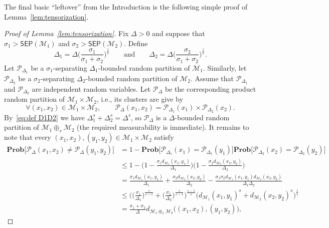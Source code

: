 \documentclass[11pt,reqno]{amsart}
\renewcommand{\le}{\leqslant}
\theoremstyle{remark}
\newcommand{\MM}{\mathcal{M}}
\renewcommand{\Pr}{\mathbf{Prob}}
\renewcommand{\1}{\mathbf 1}
\newcommand{\Part}{\mathscr{P}}
\newcommand{\sep}{\mathsf{SEP}}
\begin{document}
The final basic ``leftover'' from the Introduction is the following simple proof of Lemma~\ref{lem:tensorization}.

\begin{proof}[Proof of Lemma~\ref{lem:tensorization}] Fix $\Delta>0$ and suppose that  $\sigma_1>\sep(\MM_1)$ and $\sigma_2>\sep(\MM_2)$. Define
\begin{equation}\label{eq:def D1D2}
\Delta_1=\Delta\Big(\frac{\sigma_1}{\sigma_1+\sigma_2}\Big)^{\frac{1}{s}}\qquad\mathrm{and}\qquad  \Delta_2=\Delta\Big(\frac{\sigma_2}{\sigma_1+\sigma_2}\Big)^{\frac{1}{s}}.
\end{equation}
Let $\Part_{\Delta_1}$ be a $\sigma_1$-separating $\Delta_1$-bounded random partition of $\MM_1$. Similarly,  let $\Part_{\Delta_2}$ be a $\sigma_2$-separating $\Delta_2$-bounded random partition of $\MM_2$. Assume that $\Part_{\Delta_1}$ and $\Part_{\Delta_2}$ are independent random variables. Let $\Part_{\Delta}$ be the corresponding product random partition of $\MM_1\times\MM_2$, i.e., its clusters are give by
\begin{equation}\label{eq:product partition}
\forall(x_1,x_2)\in \MM_1\times \MM_2,\qquad \Part_\Delta(x_1,x_2)= \Part_{\Delta_1}(x_1)\times \Part_{\Delta_2}(x_2).
\end{equation}
By~\eqref{eq:def D1D2} we have $\Delta_1^s+\Delta_2^s=\Delta^s$, so $\Part_\Delta$ is a $\Delta$-bounded random partition of $\MM_1\oplus_s\MM_2$ (the required  measurability is immediate). It remains to note that every $(x_1,x_2),(y_1,y_2)\in \MM_1\times \MM_2$ satisfy
\begin{align}
\Pr\big[\Part_\Delta(x_1,x_2)\neq \Part_\Delta(y_1,y_2)\big]&=1-\Pr \big[\Part_{\Delta_1}(x_1)=\Part_{\Delta_1}(y_1)\big]\Pr \big[ \Part_{\Delta_2}(x_2)=\Part_{\Delta_2}(y_2)\big]\label{eq:use independence} \\
&\le1- \bigg(1-\frac{\sigma_1d_{\MM_1}(x_1,y_1)}{\Delta_1}\bigg)\bigg(1-\frac{\sigma_2d_{\MM_2}(x_2,y_2)}{\Delta_2}\bigg)\label{eq:use s1s1 sep}\\
&= \frac{\sigma_1d_{\MM_1}(x_1,y_1)}{\Delta_1}+\frac{\sigma_2d_{\MM_2}(x_2,y_2)}{\Delta_2}-
\frac{\sigma_1\sigma_2d_{\MM_1}(x_1,y_1)d_{\MM_2}(x_2,y_2)}{\Delta_1\Delta_2}\label{eq:drop quadratic}\\&\le
 \bigg(\Big(\frac{\sigma_1}{\Delta_1}\Big)^{\frac{s}{s-1}}+ \Big(\frac{\sigma_2}{\Delta_2}\Big)^{\frac{s}{s-1}}\bigg)^{\frac{s-1}{s}}\big(d_{\MM_1}(x_1,y_1)^s+d_{\MM_2}(x_2,y_2)^s\big)^{\frac{1}{s}}\label{eq:s holder}\\
 &=\frac{\sigma_1+\sigma_2}{\Delta}d_{\MM_1\oplus_s\MM_2}\big((x_1,x_2),(y_1,y_2)\big)\label{eq:done tensor},

\end{align}
\end{proof}
\end{document}
